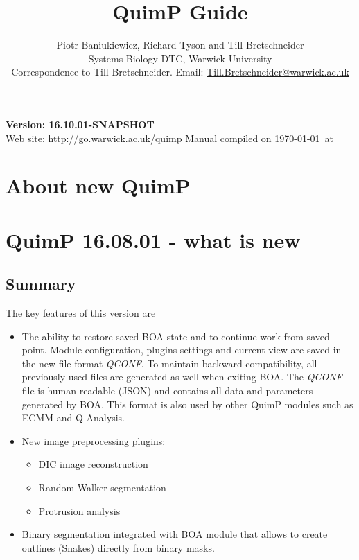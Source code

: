 \documentclass[a4paper,12pt]{article}
\begin{document}
\title{QuimP Guide}
\author{Piotr Baniukiewicz, Richard Tyson and Till Bretschneider\\ \small Systems Biology DTC, Warwick University\\ \small Correspondence to Till Bretschneider. Email: \href{mailto:Till.Bretschneider@warwick.ac.uk}{Till.Bretschneider@warwick.ac.uk}\\}
\date{}
\maketitle
\begin{center}
\textbf{{\large Version: 16.10.01-SNAPSHOT}}\\
\vspace{1cm}
Web site: \url{http://go.warwick.ac.uk/quimp}
\vfill
{\footnotesize Manual compiled on \today\  at \currenttime}
\end{center}

\tableofcontents

\setlength{\parskip}{10pt}
\setlength{\parindent}{0pt}

\section{About new QuimP}

\section{QuimP 16.08.01 - what is new}

\subsection{Summary}
The key features of this version are 
\begin{itemize}
	\item The ability to restore saved BOA state and to continue work from saved point. Module  configuration, plugins settings and current view are saved in the new file format \textit{QCONF}. To maintain backward compatibility, all previously used files are generated as well when exiting BOA. The \textit{QCONF} file is human readable (JSON) and contains all data and parameters generated by BOA. This format is also used by other QuimP modules such as ECMM and Q Analysis. 
	\item New image preprocessing plugins:
	\begin{itemize}
		\item DIC image reconstruction
		\item Random Walker segmentation
		\item Protrusion analysis
	\end{itemize}   
	\item Binary segmentation integrated with BOA module that allows to create outlines (Snakes) directly from binary masks.
\end{itemize}
	
\end{document}
